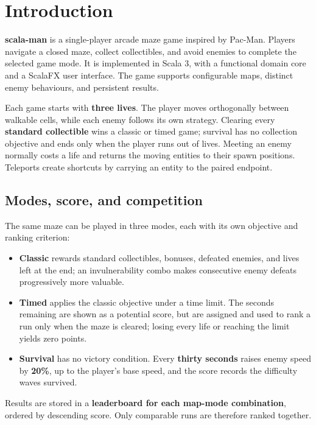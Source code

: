 \chapter{Introduction}

\textbf{scala-man} is a single-player arcade maze game inspired by Pac-Man. Players navigate a
closed maze, collect collectibles, and avoid enemies to complete the selected game mode. It
is implemented in Scala 3, with a functional domain core and a ScalaFX user interface. The game
supports configurable maps, distinct enemy behaviours, and persistent results.

Each game starts with \textbf{three lives}. The player moves orthogonally between walkable cells,
while each enemy follows its own strategy. Clearing every \textbf{standard collectible} wins a
classic or timed game; survival has no collection objective and ends only when the player runs out of lives.
Meeting an enemy normally costs a life and returns the moving entities to their spawn positions.
Teleports create shortcuts by carrying an entity to the paired endpoint.

\section{Modes, score, and competition}

The same maze can be played in three modes, each with its own objective and ranking criterion:

\begin{itemize}
  \item \textbf{Classic} rewards standard collectibles, bonuses, defeated enemies, and lives left at the end; an
  invulnerability combo makes consecutive enemy defeats progressively more valuable.
  \item \textbf{Timed} applies the classic objective under a time limit. The seconds remaining are shown as a
  potential score, but are assigned and used to rank a run only when the maze is cleared; losing every life or
  reaching the limit yields zero points.
  \item \textbf{Survival} has no victory condition. Every \textbf{thirty seconds} raises enemy speed by
  \textbf{20\%}, up to the player's base speed, and the score records the difficulty waves survived.
\end{itemize}

Results are stored in a \textbf{leaderboard for each map-mode combination}, ordered by descending score.
Only comparable runs are therefore ranked together.

